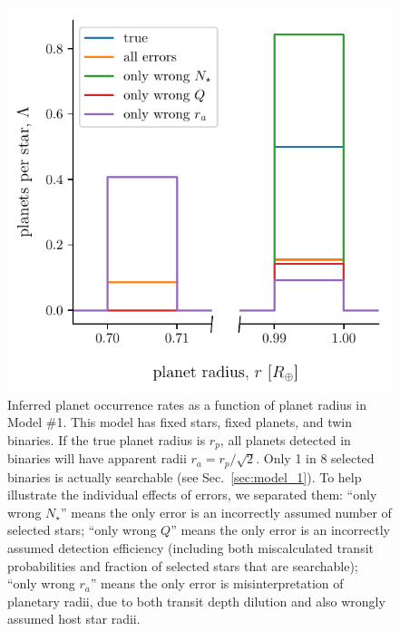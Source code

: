 \newpage
\begin{figure}
    \begin{center}
        \includegraphics[width=\textwidth]{figures/errcases_rate_density_vs_radius_model_1_brokenx.pdf}
    \end{center}
    \caption{
    Inferred planet occurrence rates as a function of planet radius in Model 
    \#1.
    This model has fixed stars, fixed planets, and twin binaries.
    If the true planet radius is $r_p$, all planets 
    detected in binaries will have apparent radii $r_a = r_p/\sqrt{2}$.
    Only 1 in 8 selected binaries is actually searchable (see 
    Sec.~\ref{sec:model_1}).
    To help illustrate the individual effects of errors, we 
    separated them:
    ``only wrong $N_\star$'' means the only error is an incorrectly assumed 
    number of selected stars;
    ``only wrong $Q$'' means the only error is an incorrectly assumed 
    detection efficiency (including both miscalculated transit probabilities 
    and 
    fraction of selected stars that are searchable);
    ``only wrong $r_a$'' means the only error is misinterpretation of 
    planetary radii, due to both transit depth dilution and also wrongly 
    assumed host star radii.
    }
    \label{fig:errcases_model_1}
\end{figure}

